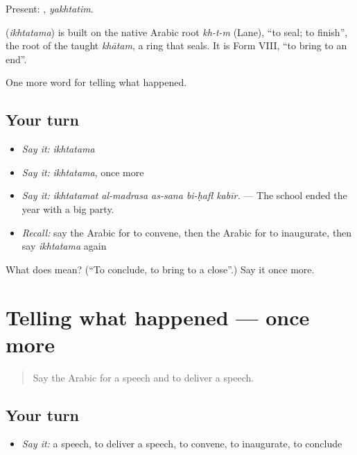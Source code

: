 Present: , \emph{yakhtatim}.

\begin{cousinweb}
\textbf{} (\emph{ikhtatama}) is built on the native Arabic root \emph{kh-t-m} (Lane), \textquotedblleft{}to seal; to finish\textquotedblright{}, the root of the taught \emph{khātam}, a ring that seals. It is Form VIII, \textquotedblleft{}to bring to an end\textquotedblright{}.
\end{cousinweb}

\begin{grammarlens}[title={What you've built}]
One more word for telling what happened.
\end{grammarlens}

\subsection*{Your turn}
\begin{itemize}
\raggedright
  \item \emph{Say it:} \emph{ikhtatama}
  \item \emph{Say it:} \emph{ikhtatama}, once more
  \item \emph{Say it:} \emph{ikhtatamat al-madrasa as-sana bi-ḥafl kabīr.} — The school ended the year with a big party.
  \item \emph{Recall:} say the Arabic for to convene, then the Arabic for to inaugurate, then say \emph{ikhtatama} again
\end{itemize}

\begin{tcolorbox}[breakable,colback=teal!4,colframe=teal!35!black,title={Before you move on}]
What does  mean? (\textquotedblleft{}To conclude, to bring to a close\textquotedblright{}.) Say it once more.
\end{tcolorbox}
\section[(dialogue)]{Telling what happened — once more}

\label{lesson:AR-R357-review-357-357}



\begin{quote}
Say the Arabic for a speech and to deliver a speech.
\end{quote}

\subsection*{Your turn}
\begin{itemize}
\raggedright
  \item \emph{Say it:} a speech, to deliver a speech, to convene, to inaugurate, to conclude
\end{itemize}

